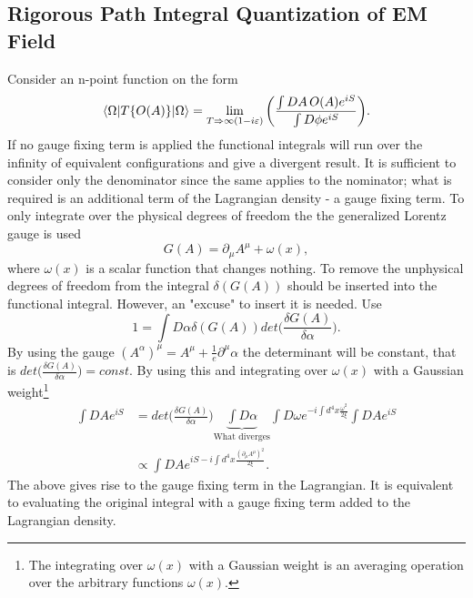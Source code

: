 \subsection*{Rigorous Path Integral Quantization of EM Field}
Consider an n-point function on the form
\begin{equation}
	\braket{\Omega|T\{O(A)\}|\Omega}=\lim\limits_{T\Rightarrow \infty(1-i\varepsilon)}\bigg(\frac{\int DA\,O(A) e^{iS}}{\int D\phi e^{iS}}\bigg).
	\label{valverde-show}
\end{equation} 
If no gauge fixing term is applied the functional integrals will run over the infinity of equivalent configurations and give a divergent result. It is sufficient to consider only the denominator since the same applies to the nominator; what is required is an additional term of the Lagrangian density - a gauge fixing term. To only integrate over the physical degrees of freedom the the generalized Lorentz gauge is used
\begin{equation}
	G(A)=\partial_\mu A^\mu+\omega(x),
\end{equation} 
where $\omega(x)$ is a scalar function that changes nothing. To remove the unphysical degrees of freedom from the integral $\delta (G(A))$ should be inserted into the functional integral. However, an "excuse" to insert it is needed. Use
\begin{equation}
	1=\int D\alpha \delta(G(A))det\bigg(\frac{\delta G(A)}{\delta \alpha}\bigg).
\end{equation} 
By using the gauge $(A^\alpha)^\mu=A^\mu+\frac{1}{e}\partial^\mu\alpha$ the determinant will be constant, that is $det\big(\frac{\delta G(A)}{\delta \alpha}\big)=const$. By using this and integrating over $\omega(x)$ with a Gaussian weight\footnote{The integrating over $\omega(x)$ with a Gaussian weight is an averaging operation over the arbitrary functions $\omega(x)$.}
\begin{equation}
	\begin{split}
		\int DA e^{iS} &=det\bigg(\frac{\delta G(A)}{\delta \alpha}\bigg) \underbrace{\int D\alpha}_{\text{What diverges}} \int D\omega e^{-i\int d^4x \frac{\omega^2}{2\xi}}\int DA e^{iS}\\
		&\propto \int DAe^{iS-i\int d^4x \frac{(\partial_\mu A^\mu)^2}{2\xi}}.
	\end{split}
\end{equation} 
The above gives rise to the gauge fixing term in the Lagrangian. It is equivalent to evaluating the original integral with a gauge fixing term added to the Lagrangian density.

